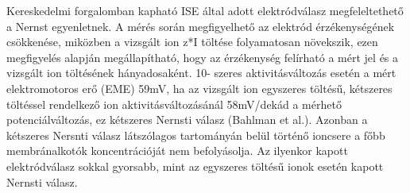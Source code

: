 Kereskedelmi forgalomban kapható ISE által adott elektródválasz megfeleltethető a Nernst egyenletnek. A mérés során megfigyelhető az elektród érzékenységének csökkenése, miközben a vizsgált ion z*I töltése folyamatosan növekszik, ezen megfigyelés alapján megállapítható, hogy az érzékenység felírható a mért jel és a vizsgált ion töltésének hányadosaként. 10- szeres aktivitásváltozás esetén a mért elektromotoros erő (EME) 59mV, ha az vizsgált ion egyszeres töltésű, kétszeres töltéssel rendelkező ion aktivitásváltozásánál 58mV/dekád a mérhető potenciálváltozás, ez kétszeres Nernsti válasz (Bahlman et al.). Azonban a kétszeres Nersnti válasz látszólagos tartományán belül történő ioncsere a főbb membránalkotók koncentrációját nem befolyásolja. Az ilyenkor kapott elektródválasz sokkal gyorsabb, mint az egyszeres töltésű ionok esetén kapott Nernsti válasz.

